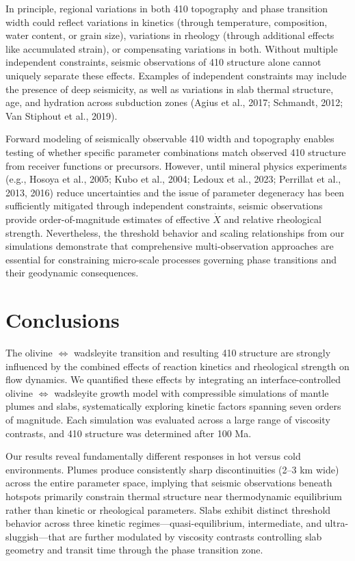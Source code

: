 \documentclass[draft,linenumbers]{agujournal2019}
\begin{document}
In principle, regional variations in both 410 topography and phase
transition width could reflect variations in kinetics (through
temperature, composition, water content, or grain size), variations in
rheology (through additional effects like accumulated strain), or
compensating variations in both. Without multiple independent
constraints, seismic observations of 410 structure alone cannot uniquely
separate these effects. Examples of independent constraints may include
the presence of deep seismicity, as well as variations in slab thermal
structure, age, and hydration across subduction zones (Agius et al.,
2017; Schmandt, 2012; Van Stiphout et al., 2019).

Forward modeling of seismically observable 410 width and topography
enables testing of whether specific parameter combinations match
observed 410 structure from receiver functions or precursors. However,
until mineral physics experiments (e.g., Hosoya et al., 2005; Kubo et
al., 2004; {Ledoux et al.}, 2023; Perrillat et al., 2013, 2016) reduce
uncertainties and the issue of parameter degeneracy has been
sufficiently mitigated through independent constraints, seismic
observations provide order-of-magnitude estimates of effective
\(\dot{X}\) and relative rheological strength. Nevertheless, the
threshold behavior and scaling relationships from our simulations
demonstrate that comprehensive multi-observation approaches are
essential for constraining micro-scale processes governing phase
transitions and their geodynamic consequences.

\section{Conclusions}\label{sec:conclusions}

The olivine \(\Leftrightarrow\) wadsleyite transition and resulting 410
structure are strongly influenced by the combined effects of reaction
kinetics and rheological strength on flow dynamics. We quantified these
effects by integrating an interface-controlled olivine
\(\Leftrightarrow\) wadsleyite growth model with compressible
simulations of mantle plumes and slabs, systematically exploring kinetic
factors spanning seven orders of magnitude. Each simulation was
evaluated across a large range of viscosity contrasts, and 410 structure
was determined after 100 Ma.

Our results reveal fundamentally different responses in hot versus cold
environments. Plumes produce consistently sharp discontinuities (2--3 km
wide) across the entire parameter space, implying that seismic
observations beneath hotspots primarily constrain thermal structure near
thermodynamic equilibrium rather than kinetic or rheological parameters.
Slabs exhibit distinct threshold behavior across three kinetic
regimes---quasi-equilibrium, intermediate, and ultra-sluggish---that are
further modulated by viscosity contrasts controlling slab geometry and
transit time through the phase transition zone.
\end{document}
